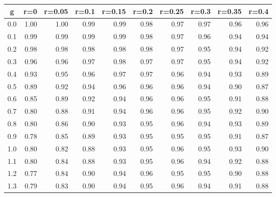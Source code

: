 %
\begin{table}[!tbp]
 \begin{center}
 \begin{tabular}{rrrrrrrrrr}\hline\hline
\multicolumn{1}{c}{g}&\multicolumn{1}{c}{r=0}&\multicolumn{1}{c}{r=0.05}&\multicolumn{1}{c}{r=0.1}&\multicolumn{1}{c}{r=0.15}&\multicolumn{1}{c}{r=0.2}&\multicolumn{1}{c}{r=0.25}&\multicolumn{1}{c}{r=0.3}&\multicolumn{1}{c}{r=0.35}&\multicolumn{1}{c}{r=0.4}\tabularnewline
\hline
0.0&1.00&1.00&0.99&0.99&0.98&0.97&0.97&0.96&0.96\tabularnewline
0.1&0.99&0.99&0.99&0.99&0.98&0.97&0.96&0.94&0.94\tabularnewline
0.2&0.98&0.98&0.98&0.98&0.98&0.97&0.95&0.94&0.92\tabularnewline
0.3&0.96&0.96&0.97&0.98&0.97&0.97&0.95&0.94&0.92\tabularnewline
0.4&0.93&0.95&0.96&0.97&0.97&0.96&0.94&0.93&0.89\tabularnewline
0.5&0.89&0.92&0.94&0.96&0.96&0.96&0.94&0.90&0.87\tabularnewline
0.6&0.85&0.89&0.92&0.94&0.96&0.96&0.95&0.91&0.88\tabularnewline
0.7&0.80&0.88&0.91&0.94&0.96&0.96&0.95&0.92&0.90\tabularnewline
0.8&0.80&0.86&0.90&0.93&0.95&0.96&0.94&0.93&0.89\tabularnewline
0.9&0.78&0.85&0.89&0.93&0.95&0.95&0.95&0.91&0.87\tabularnewline
1.0&0.80&0.82&0.88&0.93&0.95&0.96&0.95&0.93&0.90\tabularnewline
1.1&0.80&0.84&0.88&0.93&0.95&0.96&0.94&0.92&0.88\tabularnewline
1.2&0.77&0.84&0.90&0.94&0.96&0.95&0.95&0.90&0.88\tabularnewline
1.3&0.79&0.83&0.90&0.94&0.95&0.96&0.94&0.91&0.88\tabularnewline
\hline
\end{tabular}

\end{center}

\end{table}

